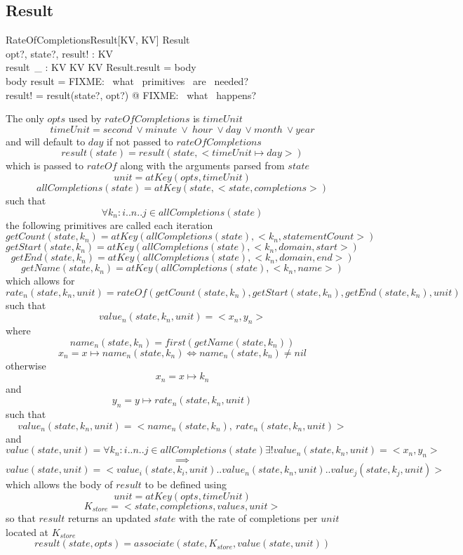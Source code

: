 \documentclass[../main.tex]{subfiles}
\begin{document}
\subsection{Result}
\begin{schema}{RateOfCompletionsResult[KV, KV]}
  Result \\
  opt?, state?, result! : KV \\
  result~\_ : KV \cross KV \surj KV
  \where
  Result.result = \langle body \rangle \\
  \langle body \rangle \bindsto result = \langle FIXME: ~what ~primitives ~are ~needed? \rangle \\
  result! = result(state?, opt?) @ FIXME: ~what ~happens?
\end{schema}
The only $opts$ used by $rateOfCompletions$ is $timeUnit$
$$timeUnit = second \ \lor minute \ \lor \ hour \ \lor day \ \lor month \ \lor year$$
and will default to $day$ if not passed to $rateOfCompletions$
$$result(state) = result(state, <timeUnit \mapsto day>)$$
which is passed to $rateOf$ along with the arguments parsed from $state$
$$unit = atKey(opts, timeUnit)$$
$$allCompletions(state) = atKey(state, <state, completions>)$$
such that
$$\forall k_{n} : i..n..j \in allCompletions(state)$$
the following primitives are called each iteration
$$getCount(state, k_{n}) = atKey(allCompletions(state), <k_{n}, statementCount>)$$
$$getStart(state, k_{n}) = atKey(allCompletions(state), <k_{n}, domain, start>)$$
$$getEnd(state, k_{n}) = atKey(allCompletions(state), <k_{n}, domain, end>)$$
$$getName(state, k_{n}) = atKey(allCompletions(state), <k_{n}, name>) $$
which allows for
$$rate_{n}(state, k_{n}, unit) = rateOf(getCount(state, k_{n}), getStart(state, k_{n}), getEnd(state, k_{n}), unit)$$
such that
$$value_{n}(state, k_{n}, unit) = <x_{n}, y_{n}>$$
where
$$name_{n}(state, k_{n}) = first(getName(state, k_{n}))$$
$$x_{n} = x \mapsto name_{n}(state, k_{n}) \iff name_{n}(state, k_{n}) \not = nil$$
otherwise
$$x_{n} = x \mapsto k_{n}$$
and
$$y_{n} = y \mapsto rate_{n}(state, k_{n}, unit)$$
such that
$$value_{n}(state, k_{n}, unit) = <name_{n}(state, k_{n}), \ rate_{n}(state, k_{n}, unit)>$$
and
$$value(state, unit) = \forall k_{n} : i..n..j \in allCompletions(state) \exists! value_{n}(state, k_{n}, unit) = <x_{n}, y_{n}>$$
$$\implies$$
$$value(state, unit) = <value_{i}(state, k_{i}, unit)..value_{n}(state, k_{n}, unit)..value_{j}(state, k_{j}, unit)>$$
which allows the body of $result$ to be defined using
$$unit = atKey(opts, timeUnit)$$
$$K_{store} = <state, completions, values, unit>$$
so that $result$ returns an updated $state$ with the rate of completions per $unit$ located at $K_{store}$
$$result(state, opts) = associate(state, K_{store}, value(state, unit))$$
\end{document}
